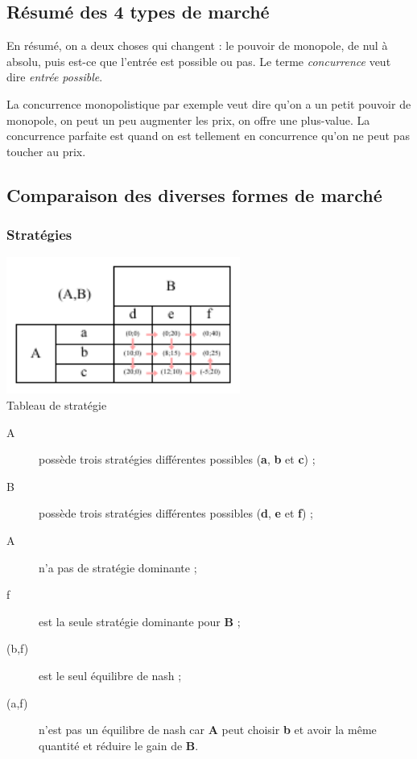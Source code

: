 \subsection{Résumé des 4 types de marché}
En résumé, on a deux choses qui changent : le pouvoir de monopole, de nul à absolu, puis est-ce que l'entrée est possible ou pas. Le terme \textit{concurrence} veut dire \textit{entrée possible}.

La concurrence monopolistique par exemple veut dire qu'on a un petit pouvoir de monopole, on peut un peu augmenter
les prix, on offre une plus-value. La concurrence parfaite est quand on est tellement en concurrence qu'on ne peut pas toucher au prix.



\subsection{Comparaison des diverses formes de marché}



\subsubsection{Stratégies}


\begin{center}
	\includegraphics[height=4.5cm]{images/strategie.pdf}\\
	Tableau de stratégie
\end{center}
\begin{description}
	\item [A] possède trois stratégies différentes possibles (\textbf{a}, \textbf{b} et \textbf{c}) ;
	\item [B] possède trois stratégies différentes possibles (\textbf{d}, \textbf{e} et \textbf{f}) ;
	\item [A] n'a pas de stratégie dominante ;
	\item [f] est la seule stratégie dominante pour \textbf{B} ;
	\item [(b,f)] est le seul équilibre de nash ;
	\item [(a,f)] n'est pas un équilibre de nash car \textbf{A} peut choisir \textbf{b} et avoir la même quantité et réduire le gain de \textbf{B}.
\end{description}